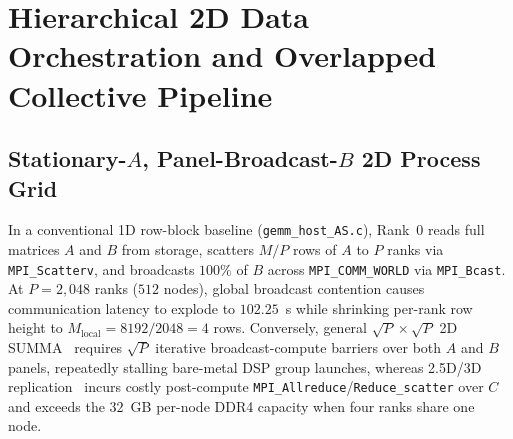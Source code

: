 \documentclass[conference]{IEEEtran}
\begin{document}
\section{Hierarchical 2D Data Orchestration and Overlapped Collective Pipeline}
\label{sec:host_2d}

\subsection{Stationary-$A$, Panel-Broadcast-$B$ 2D Process Grid}
In a conventional 1D row-block baseline (\texttt{gemm\_host\_AS.c}), Rank~0 reads full matrices $A$ and $B$ from storage, scatters $M/P$ rows of $A$ to $P$ ranks via \texttt{MPI\_Scatterv}, and broadcasts $100\%$ of $B$ across \texttt{MPI\_COMM\_WORLD} via \texttt{MPI\_Bcast}. At $P = 2{,}048$ ranks ($512$ nodes), global broadcast contention causes communication latency to explode to $102.25$~s while shrinking per-rank row height to $M_{\mathrm{local}} = 8192 / 2048 = 4$ rows. Conversely, general $\sqrt{P} \times \sqrt{P}$ 2D SUMMA~\cite{vandegeijn1997summa} requires $\sqrt{P}$ iterative broadcast-compute barriers over both $A$ and $B$ panels, repeatedly stalling bare-metal DSP group launches, whereas 2.5D/3D replication~\cite{solomonik2011comm25d} incurs costly post-compute \texttt{MPI\_Allreduce}/\texttt{Reduce\_scatter} over $C$ and exceeds the $32$~GB per-node DDR4 capacity when four ranks share one node.
\end{document}
